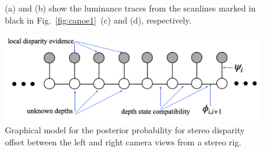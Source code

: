 \begin{figure}
\centerline{
}
\centerline{
}
\caption{(a) and (b) show the luminance traces from the scanlines marked in black in Fig.~\ref{fig:canoe1}~(c) and (d), respectively.}
\label{fig:canoe2}
\end{figure}

\begin{figure}
\centerline{
\includegraphics[width=0.80\linewidth]{figures/graphical_models/stereomodel2.jpg}
}
\caption{Graphical model for the posterior probability for stereo disparity offset between the left and right camera views from a stereo rig.}
\label{fig:canoe3}
\end{figure}

